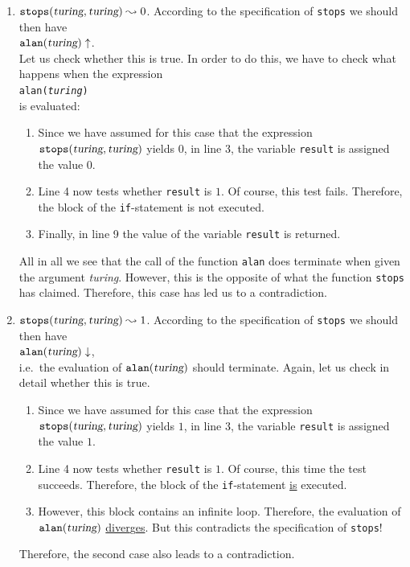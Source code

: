 \begin{enumerate}
\item $\mathtt{stops}(\textsl{turing}, \textsl{turing}) \leadsto 0$.
According to the specification of \texttt{stops} we should then have
      \\[0.2cm]
      \hspace*{1.3cm}
      $\mathtt{alan}(\textsl{turing}) \uparrow$.
\\[0.2cm]
      Let us check whether this is true.
In order to do this, we have to check what happens when
      the expression
      \\[0.2cm]
      \hspace*{1.3cm}
      \texttt{alan(\textsl{turing})} 
      \\[0.2cm]
      is evaluated:
      \begin{enumerate}
      \item Since we have assumed for this case that the expression 
            $\mathtt{stops}(\textsl{turing}, \textsl{turing})$ yields $0$, 
            in line 3, the variable \texttt{result} is assigned the value 0. 
      \item Line 4 now tests whether \texttt{result} is $1$.
Of course,
            this test fails.
Therefore, the block of the \texttt{if}-statement is not executed.
      \item Finally, in line 9 the value of the variable \texttt{result} is returned.
\end{enumerate}
      All in all we see that the call of the function \texttt{alan} does terminate when given the argument
      \textsl{turing}.
However, this is the opposite of what the function \texttt{stops} has claimed.
Therefore, this case has led us to a contradiction.
\item  $\mathtt{stops}(\textsl{turing}, \textsl{turing}) \leadsto 1$.
According to the specification of \texttt{stops} we should then have
      \\[0.2cm]
      \hspace*{1.3cm}
      $\mathtt{alan}(\textsl{turing}) \downarrow$, 
      \\[0.2cm]
      i.e.~the evaluation of $\mathtt{alan}(\textsl{turing})$ should terminate.
Again, let us check in detail whether this is true.
\begin{enumerate}
      \item Since we have assumed for this case that the expression 
            $\mathtt{stops}(\textsl{turing}, \textsl{turing})$ yields $1$, 
            in line 3, the variable \texttt{result} is assigned the value $1$.
\item Line 4 now tests whether \texttt{result} is $1$.  Of course,
            this time the test succeeds.
Therefore, the block of the \texttt{if}-statement \underline{is} executed.
      \item However, this block contains an infinite loop.
Therefore, the
            evaluation of $\mathtt{alan}(\textsl{turing})$ \underline{diver}g\underline{es}.
But this contradicts the specification of \texttt{stops}!
      \end{enumerate}   
      Therefore, the second case also leads to a contradiction.
\end{enumerate}
